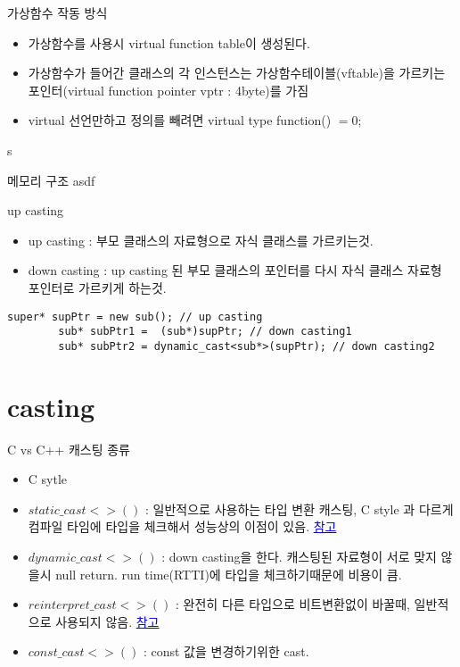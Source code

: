 \documentclass[10pt]{beamer}
\begin{document}
\begin{frame}{가상함수 작동 방식}
    \begin{itemize}
        \item 가상함수를 사용시 virtual function table이 생성된다.
        \item 가상함수가 들어간 클래스의 각 인스턴스는 가상함수테이블(vftable)을 가르키는 포인터(virtual function pointer vptr : 4byte)를 가짐
        \item virtual 선언만하고 정의를 빼려면 virtual type function() $=0$;
    \end{itemize}s
\end{frame}


\begin{frame}[fragile]{메모리 구조}
    asdf
\end{frame}    


\begin{frame}[fragile]{up casting}
    \begin{itemize}
        \item up casting : 부모 클래스의 자료형으로 자식 클래스를 가르키는것.
        \item down casting : up casting 된 부모 클래스의 포인터를 다시 자식 클래스 자료형 포인터로 가르키게 하는것.
    \end{itemize}
    \begin{lstlisting}[style = CppStyle]
        super* supPtr = new sub(); // up casting
        sub* subPtr1 =  (sub*)supPtr; // down casting1
        sub* subPtr2 = dynamic_cast<sub*>(supPtr); // down casting2
    \end{lstlisting}
\end{frame}

\section{casting}

\begin{frame}{C vs C++ 캐스팅 종류}
    \begin{itemize}
        \item C sytle 
        \item $static\_cast<>()$ : 일반적으로 사용하는 타입 변환 캐스팅, C style 과 다르게 컴파일 타임에 타입을 체크해서 성능상의 이점이 있음. \href{https://stackoverflow.com/questions/28002/regular-cast-vs-static-cast-vs-dynamic-cast}{\textcolor{blue}{참고}}
        \item $dynamic\_cast<>()$ : down casting을 한다. 캐스팅된 자료형이 서로 맞지 않을시 null return. run time(RTTI)에 타입을 체크하기때문에 비용이 큼.
        \item $reinterpret\_cast<>()$ : 완전히 다른 타입으로 비트변환없이 바꿀때, 일반적으로 사용되지 않음. \href{https://stackoverflow.com/questions/573294/when-to-use-reinterpret-cast}{\textcolor{blue}{참고}}
        \item $const\_cast<>()$ : const 값을 변경하기위한 cast.
    \end{itemize}
\end{frame}
\end{document}
